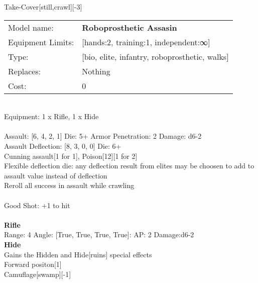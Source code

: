 \noindent Take-Cover[still,crawl][-3]\\ 


\noindent
\begin{tabular}{ll}
Model name: &{\bf Roboprosthetic Assasin } \\
Equipment Limits: &[hands:2, training:1, independent:∞] \\
Type: &[bio, elite, infantry, roboprosthetic, walks] \\
Replaces: &Nothing \\
Cost: & 0\\
\end{tabular}
\ \\
Equipment: 1 x Rifle, 1 x Hide \\
\ \\
Assault: [6, 4, 2, 1] Die: 5+ Armor Penetration: 2 Damage: d6-2 \\
Assault Deflection: [8, 3, 0, 0] Die: 6+\\
\indent Cunning assault[1 for 1], Poison[12][1 for 2]\\ 
Flexible deflection die: any deflection result from elites may be choosen to add to assault value instead of deflection\\ 
Reroll all success in assault while crawling\\ 
 
\ \\
Good Shot: +1 to hit\\ 

\ \\
{\bf Rifle } \\



Range: 4  Angle: [True, True, True, True]: AP: 2 Damage:d6-2 \\




{\bf Hide } \\

Gains the Hidden and Hide[ruins] special effects\\ 
Forward positon[1]\\ 
Camuflage[swamp][-1]\\ 





 
\ \\



